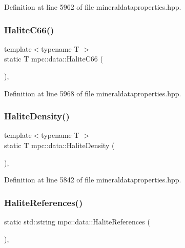 Definition at line 5962 of file mineraldataproperties.\+hpp.

\mbox{\label{namespacempc_1_1data_a83fd1eb0c7a98fda68f363c1d0d03153}} 
\subsubsection{\texorpdfstring{Halite\+C66()}{HaliteC66()}}
{\footnotesize\ttfamily template$<$typename T $>$ \\
static T mpc\+::data\+::\+Halite\+C66 (\begin{DoxyParamCaption}{ }\end{DoxyParamCaption})\hspace{0.3cm}{\ttfamily [inline]}, {\ttfamily [static]}}



Definition at line 5968 of file mineraldataproperties.\+hpp.

\mbox{\label{namespacempc_1_1data_a05ac4ad7e377d10cf924f30c12281826}} 
\subsubsection{\texorpdfstring{Halite\+Density()}{HaliteDensity()}}
{\footnotesize\ttfamily template$<$typename T $>$ \\
static T mpc\+::data\+::\+Halite\+Density (\begin{DoxyParamCaption}{ }\end{DoxyParamCaption})\hspace{0.3cm}{\ttfamily [inline]}, {\ttfamily [static]}}



Definition at line 5842 of file mineraldataproperties.\+hpp.

\mbox{\label{namespacempc_1_1data_abec8a93faf59e884c149c84fe779700e}} 
\subsubsection{\texorpdfstring{Halite\+References()}{HaliteReferences()}}
{\footnotesize\ttfamily static std\+::string mpc\+::data\+::\+Halite\+References (\begin{DoxyParamCaption}{ }\end{DoxyParamCaption})\hspace{0.3cm}{\ttfamily [inline]}, {\ttfamily [static]}}



